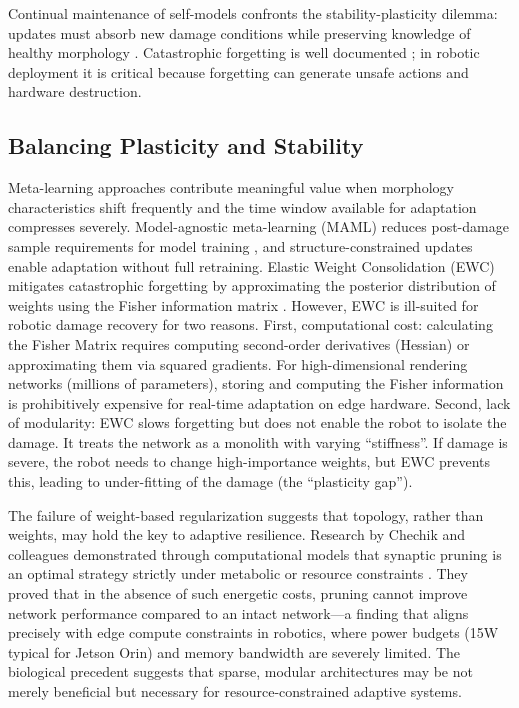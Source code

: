 \documentclass[12pt,a4paper,oneside]{report}
\begin{document}
Continual maintenance of self-models confronts the stability-plasticity dilemma: updates must absorb new damage conditions while preserving knowledge of healthy morphology \cite{grossberg1987competitive, mermillod2013stability}. Catastrophic forgetting is well documented \cite{mccloskey1989catastrophic, french1999catastrophic}; in robotic deployment it is critical because forgetting can generate unsafe actions and hardware destruction.

\subsection{Balancing Plasticity and Stability}

Meta-learning approaches contribute meaningful value when morphology characteristics shift frequently and the time window available for adaptation compresses severely. Model-agnostic meta-learning (MAML) reduces post-damage sample requirements for model training \cite{finn2017maml}, and structure-constrained updates enable adaptation without full retraining. Elastic Weight Consolidation (EWC) mitigates catastrophic forgetting by approximating the posterior distribution of weights using the Fisher information matrix \cite{kirkpatrick2017overcoming}. However, EWC is ill-suited for robotic damage recovery for two reasons. First, computational cost: calculating the Fisher Matrix requires computing second-order derivatives (Hessian) or approximating them via squared gradients. For high-dimensional rendering networks (millions of parameters), storing and computing the Fisher information is prohibitively expensive for real-time adaptation on edge hardware. Second, lack of modularity: EWC slows forgetting but does not enable the robot to isolate the damage. It treats the network as a monolith with varying ``stiffness''. If damage is severe, the robot needs to change high-importance weights, but EWC prevents this, leading to under-fitting of the damage (the ``plasticity gap'').

The failure of weight-based regularization suggests that topology, rather than weights, may hold the key to adaptive resilience. Research by Chechik and colleagues demonstrated through computational models that synaptic pruning is an optimal strategy strictly under metabolic or resource constraints \cite{chechik1998synaptic}. They proved that in the absence of such energetic costs, pruning cannot improve network performance compared to an intact network---a finding that aligns precisely with edge compute constraints in robotics, where power budgets (15W typical for Jetson Orin) and memory bandwidth are severely limited. The biological precedent suggests that sparse, modular architectures may be not merely beneficial but necessary for resource-constrained adaptive systems.
\end{document}
